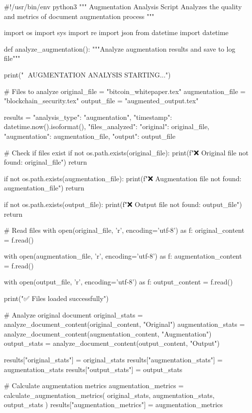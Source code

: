 #!/usr/bin/env python3
"""
Augmentation Analysis Script
Analyzes the quality and metrics of document augmentation process
"""

import os
import sys
import re
import json
from datetime import datetime

def analyze_augmentation():
    """Analyze augmentation results and save to log file"""
    
    print("🚀 AUGMENTATION ANALYSIS STARTING...")
    
    # Files to analyze
    original_file = "bitcoin_whitepaper.tex"
    augmentation_file = "blockchain_security.tex"
    output_file = "augmented_output.tex"
    
    results = {
        "analysis_type": "augmentation",
        "timestamp": datetime.now().isoformat(),
        "files_analyzed": {
            "original": original_file,
            "augmentation": augmentation_file,
            "output": output_file
        }
    }
    
    # Check if files exist
    if not os.path.exists(original_file):
        print(f"❌ Original file not found: {original_file}")
        return
    
    if not os.path.exists(augmentation_file):
        print(f"❌ Augmentation file not found: {augmentation_file}")
        return
        
    if not os.path.exists(output_file):
        print(f"❌ Output file not found: {output_file}")
        return
    
    # Read files
    with open(original_file, 'r', encoding='utf-8') as f:
        original_content = f.read()
    
    with open(augmentation_file, 'r', encoding='utf-8') as f:
        augmentation_content = f.read()
        
    with open(output_file, 'r', encoding='utf-8') as f:
        output_content = f.read()
    
    print("✅ Files loaded successfully")
    
    # Analyze original document
    original_stats = analyze_document_content(original_content, "Original")
    augmentation_stats = analyze_document_content(augmentation_content, "Augmentation")
    output_stats = analyze_document_content(output_content, "Output")
    
    results["original_stats"] = original_stats
    results["augmentation_stats"] = augmentation_stats
    results["output_stats"] = output_stats
    
    # Calculate augmentation metrics
    augmentation_metrics = calculate_augmentation_metrics(
        original_stats, augmentation_stats, output_stats
    )
    results["augmentation_metrics"] = augmentation_metrics
    
